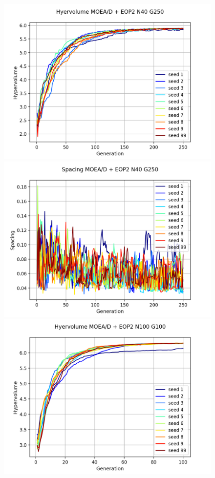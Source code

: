 \begin{figure}[H]
\centering
\includegraphics[scale=0.5]{figures/METRICS_EOP2/Hypervol_N40_G250.png}\quad 
\includegraphics[scale=0.5]{figures/METRICS_EOP2/Spacing_N40_G250.png}\\
\includegraphics[scale=0.5]{figures/METRICS_EOP2/Hypervol_N100_G100.png} \quad 

\end{figure}
